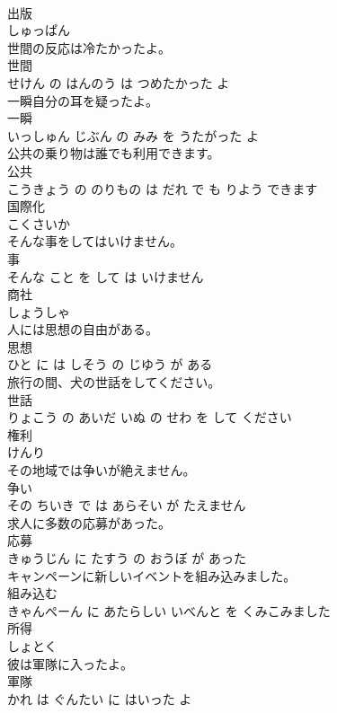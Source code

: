 \documentclass[8pt]{extreport}
\begin{document}
\begin{CJK}{UTF8}{min}
\\	出版	
\\	しゅっぱん		
\\	世間の反応は冷たかったよ。	
\\	世間 
\\	せけん の はんのう は つめたかった よ		
\\	一瞬自分の耳を疑ったよ。	
\\	一瞬 
\\	いっしゅん じぶん の みみ を うたがった よ		
\\	公共の乗り物は誰でも利用できます。	
\\	公共 
\\	こうきょう の のりもの は だれ で も りよう できます		
\\	国際化	
\\	こくさいか		
\\	そんな事をしてはいけません。	
\\	事 
\\	そんな こと を して は いけません		
\\	商社	
\\	しょうしゃ		
\\	人には思想の自由がある。	
\\	思想 
\\	ひと に は しそう の じゆう が ある		
\\	旅行の間、犬の世話をしてください。	
\\	世話 
\\	りょこう の あいだ いぬ の せわ を して ください		
\\	権利	
\\	けんり		
\\	その地域では争いが絶えません。	
\\	争い 
\\	その ちいき で は あらそい が たえません		
\\	求人に多数の応募があった。	
\\	応募 
\\	きゅうじん に たすう の おうぼ が あった		
\\	キャンペーンに新しいイベントを組み込みました。	
\\	組み込む 
\\	きゃんぺーん に あたらしい いべんと を くみこみました		
\\	所得	
\\	しょとく		
\\	彼は軍隊に入ったよ。	
\\	軍隊 
\\	かれ は ぐんたい に はいった よ		

\end{CJK}
\end{document}
